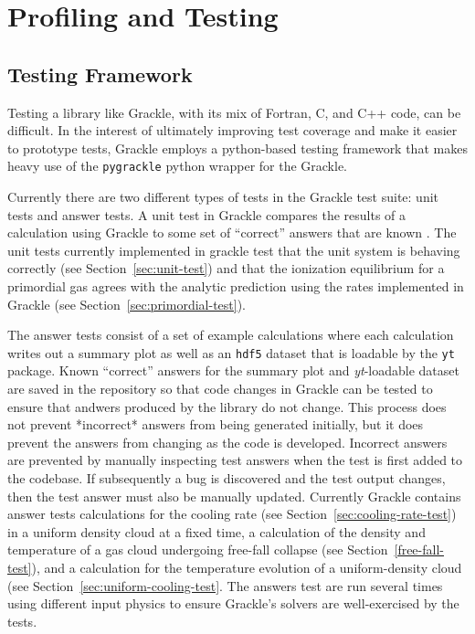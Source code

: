 \section{Profiling and Testing} \label{sec:profiling-and-testing}



\subsection{Testing Framework}

Testing a library like Grackle, with its mix of Fortran, C, and C++ code, can be
difficult. In the interest of ultimately improving test coverage and make it
easier to prototype tests, Grackle employs a python-based testing framework that
makes heavy use of the \texttt{pygrackle} python wrapper for the Grackle.

Currently there are two different types of tests in the Grackle test suite: unit
tests and answer tests. A unit test in Grackle compares the results of a
calculation using Grackle to some set of ``correct'' answers that are known
. The unit tests currently implemented in grackle test that the
unit system is behaving correctly (see Section~\ref{sec:unit-test}) and that the
ionization equilibrium for a primordial gas agrees with the analytic prediction
using the rates implemented in Grackle (see Section~\ref{sec:primordial-test}).

The answer tests consist of a set of example calculations where each calculation
writes out a summary plot as well as an \texttt{hdf5} dataset that is loadable
by the \texttt{yt} package. Known ``correct'' answers for the summary plot and
\textit{yt}-loadable dataset are saved in the repository so that code changes in
Grackle can be tested to ensure that andwers produced by the library do not
change. This process does not prevent *incorrect* answers from being generated
initially, but it does prevent the answers from changing as the code is
developed. Incorrect answers are prevented by manually inspecting test answers
when the test is first added to the codebase. If subsequently a bug is
discovered and the test output changes, then the test answer must also be
manually updated. Currently Grackle contains answer tests calculations for the
cooling rate (see Section~\ref{sec:cooling-rate-test}) in a uniform density
cloud at a fixed time, a calculation of the density and temperature of a gas
cloud undergoing free-fall collapse (see Section~\ref{free-fall-test}), and a
calculation for the temperature evolution of a uniform-density cloud (see
Section~\ref{sec:uniform-cooling-test}.  The answers test are run several times
using different input physics to ensure Grackle's solvers are well-exercised by
the tests.

